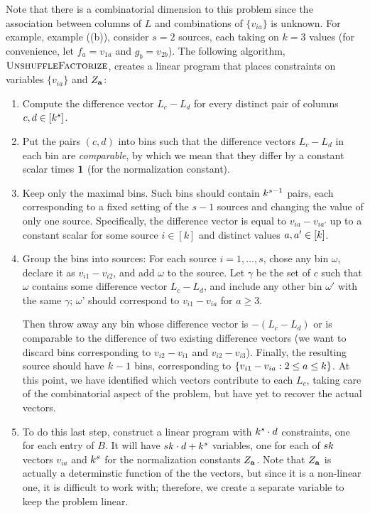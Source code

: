 Note that there is a combinatorial dimension to this problem since the association between
columns of $L$ and combinations of $\{ v_{ia} \}$ is unknown.
For example, example ((b)),
consider $s=2$ sources, each taking on $k=3$ values
(for convenience, let $f_a = v_{1a}$ and $g_b = v_{2b}$).
The following algorithm, $\text{\sc UnshuffleFactorize}$,
creates a linear program that places constraints on
variables $\{v_{ia}\}$ and $Z_{\mathbf{a}}$:
\begin{enumerate}

\item Compute the difference vector $L_c - L_d$ for every distinct pair of
columns $c,d \in [k^s]$.

\item Put the pairs $(c,d)$ into bins such that the difference vectors $L_c-L_d$
in each bin are \emph{comparable}, by which we mean that they
differ by a constant scalar times $\mathbf{1}$ (for the normalization constant).

\item Keep only the maximal bins.
Such bins should contain $k^{s-1}$ pairs, each corresponding to a fixed
setting of the $s-1$ sources
and changing the value of only one source.
Specifically, the difference vector is equal to $v_{ia} - v_{ia'}$ up to a
constant scalar for some source $i \in [k]$ and distinct values $a, a' \in
[k]$.

\item Group the bins into sources:
  For each source $i = 1, \dots, s$,
  chose any bin $\omega$, declare it as $v_{i1} - v_{i2}$,
  and add $\omega$ to the source.
  Let $\gamma$ be the set of $c$ such that $\omega$
  contains some difference vector $L_c - L_d$,
  and include any other bin $\omega'$ with the same $\gamma$;
  $\omega$' should correspond to $v_{i1} - v_{ia}$ for $a \ge 3$.

  Then throw away any bin whose difference vector is $-(L_c - L_d)$
  or is comparable to the difference of two existing difference vectors
  (we want to discard bins corresponding to $v_{i2} - v_{i1}$ and $v_{i2} - v_{i3}$).
  Finally, the resulting source should have $k-1$ bins, corresponding to $\{ v_{i1} - v_{ia} : 2 \le a \le k \}$.
  At this point, we have identified which vectors contribute to each $L_c$,
  taking care of the combinatorial aspect of the problem,
  but have yet to recover the actual vectors.

  \item To do this last step, construct a linear program with $k^s \cdot d$ constraints, one for each entry of $B$.
  It will have $sk \cdot d + k^s$ variables,
  one for each of $sk$ vectors $v_{ia}$ and $k^s$ for the normalization constants $Z_{\mathbf{a}}$.
  Note that $Z_{\mathbf{a}}$ is actually a determinstic function of the the vectors, but since it is a non-linear one,
  it is difficult to work with; therefore, we create a separate variable to keep the problem linear.

\end{enumerate}

